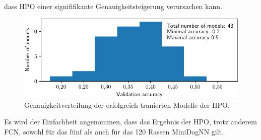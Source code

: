 dass HPO einer signififikante Genauigkeitsteigerung verursachen kann.
\begin{figure}
\centering
\includegraphics[width=\the\textwidth]{../../final_data/MiniNN_n5/acc_hist.pdf}
\caption{Genauigkeitverteilung der erfolgreich tranierten Modelle der HPO.}
\label{fig:Genauigkeitverteilung_MiniDogNN}
\end{figure}
Es wird der Einfachheit angenommen, dass das Ergebnis der HPO, trotz anderem
FCN, sowohl für das fünf als auch für das 120 Rassen MiniDogNN gilt.


